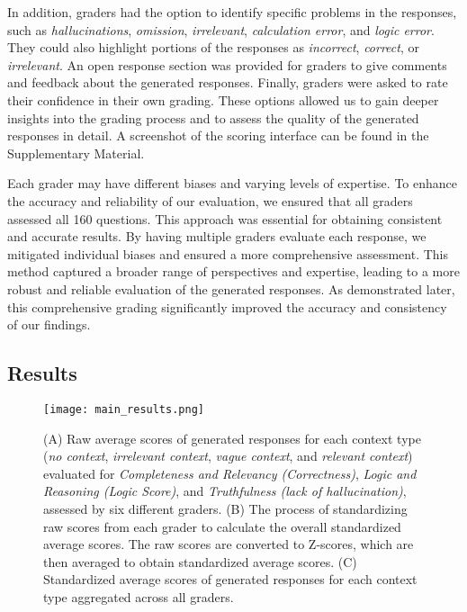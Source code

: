 \documentclass{article}
\begin{document}
    In addition, graders had the option to identify specific problems in the responses, such as \emph{hallucinations}, \emph{omission}, \emph{irrelevant}, \emph{calculation error}, and \emph{logic error}. They could also highlight portions of the responses as \emph{incorrect}, \emph{correct}, or \emph{irrelevant}. An open response section was provided for graders to give comments and feedback about the generated responses. Finally, graders were asked to rate their confidence in their own grading. These options allowed us to gain deeper insights into the grading process and to assess the quality of the generated responses in detail.
    A screenshot of the scoring interface can be found in the Supplementary Material.

    Each grader may have different biases and varying levels of expertise. To enhance the accuracy and reliability of our evaluation, we ensured that all graders assessed all 160 questions. This approach was essential for obtaining consistent and accurate results. By having multiple graders evaluate each response, we mitigated individual biases and ensured a more comprehensive assessment. This method captured a broader range of perspectives and expertise, leading to a more robust and reliable evaluation of the generated responses. As demonstrated later, this comprehensive grading significantly improved the accuracy and consistency of our findings.
    
\subsection{Results}


    \begin{figure}
        \centering
        \texttt{[image: main\_results.png]}
        \caption{(A) Raw average scores of generated responses for each context type (\emph{no context}, \emph{irrelevant context}, \emph{vague context}, and \emph{relevant context}) evaluated for \emph{Completeness and Relevancy (Correctness)}, \emph{Logic and Reasoning (Logic Score)}, and \emph{Truthfulness (lack of hallucination)}, assessed by six different graders. (B) The process of standardizing raw scores from each grader to calculate the overall standardized average scores. The raw scores are converted to Z-scores, which are then averaged to obtain standardized average scores. (C) Standardized average scores of generated responses for each context type aggregated across all graders.} 
        \label{fig:main_results_plot}
    \end{figure}
\end{document}
